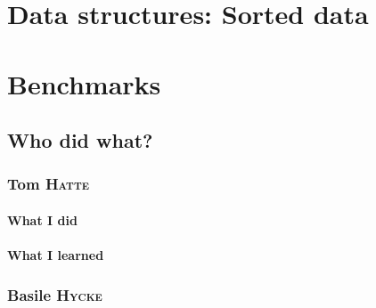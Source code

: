 \documentclass[a4paper,notitlepage]{report}
\newcommand{\authorOne}   {Tom    \textsc{Hatte}}
\newcommand{\authorTwo}   {Basile \textsc{Hycke}}
\begin{document}











\part{Data structures: Sorted data}










\part{Benchmarks}










\appendix




\chapter{Who did what?}

\section{\authorOne}

\subsection{What I did}

\subsection{What I learned}


\section{\authorTwo}
\end{document}
